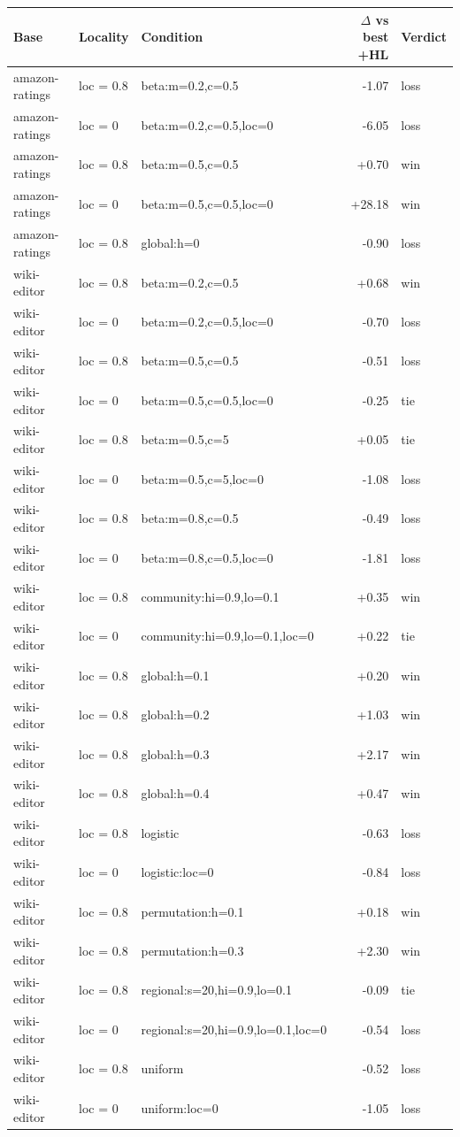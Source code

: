 \begin{tabular}{lllrl}
\toprule
Base & Locality & Condition & $\Delta$ vs best +HL & Verdict \\
\midrule
amazon-ratings & loc = 0.8 & beta:m=0.2,c=0.5 & -1.07 & loss \\
amazon-ratings & loc = 0 & beta:m=0.2,c=0.5,loc=0 & -6.05 & loss \\
amazon-ratings & loc = 0.8 & beta:m=0.5,c=0.5 & +0.70 & win \\
amazon-ratings & loc = 0 & beta:m=0.5,c=0.5,loc=0 & +28.18 & win \\
amazon-ratings & loc = 0.8 & global:h=0 & -0.90 & loss \\
wiki-editor & loc = 0.8 & beta:m=0.2,c=0.5 & +0.68 & win \\
wiki-editor & loc = 0 & beta:m=0.2,c=0.5,loc=0 & -0.70 & loss \\
wiki-editor & loc = 0.8 & beta:m=0.5,c=0.5 & -0.51 & loss \\
wiki-editor & loc = 0 & beta:m=0.5,c=0.5,loc=0 & -0.25 & tie \\
wiki-editor & loc = 0.8 & beta:m=0.5,c=5 & +0.05 & tie \\
wiki-editor & loc = 0 & beta:m=0.5,c=5,loc=0 & -1.08 & loss \\
wiki-editor & loc = 0.8 & beta:m=0.8,c=0.5 & -0.49 & loss \\
wiki-editor & loc = 0 & beta:m=0.8,c=0.5,loc=0 & -1.81 & loss \\
wiki-editor & loc = 0.8 & community:hi=0.9,lo=0.1 & +0.35 & win \\
wiki-editor & loc = 0 & community:hi=0.9,lo=0.1,loc=0 & +0.22 & tie \\
wiki-editor & loc = 0.8 & global:h=0.1 & +0.20 & win \\
wiki-editor & loc = 0.8 & global:h=0.2 & +1.03 & win \\
wiki-editor & loc = 0.8 & global:h=0.3 & +2.17 & win \\
wiki-editor & loc = 0.8 & global:h=0.4 & +0.47 & win \\
wiki-editor & loc = 0.8 & logistic & -0.63 & loss \\
wiki-editor & loc = 0 & logistic:loc=0 & -0.84 & loss \\
wiki-editor & loc = 0.8 & permutation:h=0.1 & +0.18 & win \\
wiki-editor & loc = 0.8 & permutation:h=0.3 & +2.30 & win \\
wiki-editor & loc = 0.8 & regional:s=20,hi=0.9,lo=0.1 & -0.09 & tie \\
wiki-editor & loc = 0 & regional:s=20,hi=0.9,lo=0.1,loc=0 & -0.54 & loss \\
wiki-editor & loc = 0.8 & uniform & -0.52 & loss \\
wiki-editor & loc = 0 & uniform:loc=0 & -1.05 & loss \\
\bottomrule
\end{tabular}
